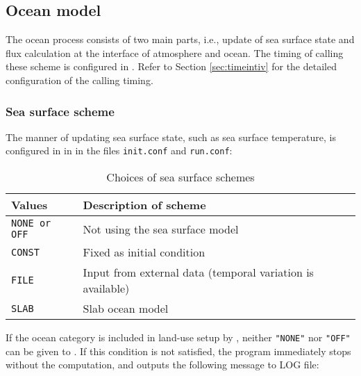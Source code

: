 \subsection{Ocean model} \label{subsecp:basic_usel_ocean}
The ocean process consists of two main parts, i.e., update of sea surface state and flux calculation at the interface of atmosphere and ocean. The timing of calling these scheme is configured in . Refer to Section \ref{sec:timeintiv} for the detailed configuration of the calling timing.

\subsubsection{Sea surface scheme}
The manner of updating sea surface state, such as sea surface temperature, is configured in  in  in the files \verb|init.conf| and \verb|run.conf|:

\begin{table}[h]
\begin{center}
  \caption{Choices of sea surface schemes}
  \label{tab:nml_ocean}
  \begin{tabularx}{150mm}{lX} \hline
    \rowcolor[gray]{0.9}  Values & Description of scheme \\ \hline
      \verb|NONE or OFF| & Not using the sea surface model         \\
      \verb|CONST|        & Fixed as initial condition           \\
      \verb|FILE|         & Input from external data (temporal variation is available) \\
      \verb|SLAB|         & Slab ocean model                   \\
    \hline
  \end{tabularx}
\end{center}
\end{table}

If the ocean category is included in land-use setup by , neither \verb|"NONE"| nor \verb|"OFF"| can be given to . If this condition is not satisfied, the program immediately stops without the computation, and outputs the following message to LOG file:

